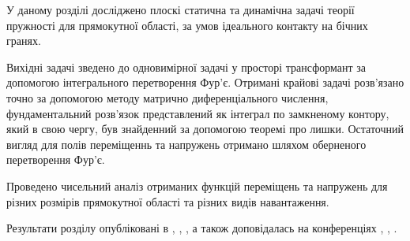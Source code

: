 У даному розділі досліджено плоскі статична та динамічна задачі теорії пружності для прямокутної області,
за умов ідеального контакту на бічних гранях.

Вихідні задачі зведено до одновимірної задачі у просторі трансформант за допомогою інтегрального перетворення Фур'є.
Отримані крайові задачі розв'язано точно за допомогою методу матрично диференціального числення,
фундаментальний розв'язок представлений як інтеграл по замкненому контору, який в свою чергу, був знайденний за допомогою теоремі про лишки.
Остаточний вигляд для полів переміщеннь та напружень отримано шляхом оберненого перетворення Фур'є.

Проведено чисельний аналіз отриманих функцій переміщень та напружень для різних розмірів прямокутної області та різних видів навантаження.

Результати розділу опубліковані в \cite{pozhylenkov_1}, \cite{pozhylenkov_2}, \cite{pozhylenkov_3}, \cite{pozhylenkov_5}
а також доповідалась на конференціях \cite{conf_1}, \cite{conf_2}, \cite{conf_4}.